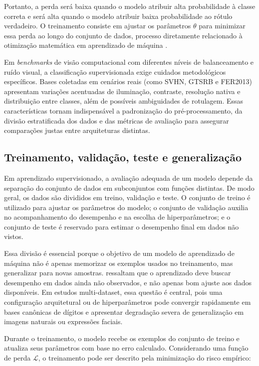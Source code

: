\documentclass[
    12pt,
    openright,
    oneside,
    a4paper,
    english,
    brazil
]{abntex2}
\begin{document}
Portanto, a perda será baixa quando o modelo atribuir alta probabilidade à classe correta e será alta quando o modelo atribuir baixa probabilidade ao rótulo verdadeiro. O treinamento consiste em ajustar os parâmetros \(\theta\) para minimizar essa perda ao longo do conjunto de dados, processo diretamente relacionado à otimização matemática em aprendizado de máquina \cite{deisenroth2020mathematics,goodfellow2016deep}.

Em \textit{benchmarks} de visão computacional com diferentes níveis de balanceamento e ruído visual, a classificação supervisionada exige cuidados metodológicos específicos. Bases coletadas em cenários reais (como SVHN, GTSRB e FER2013) apresentam variações acentuadas de iluminação, contraste, resolução nativa e distribuição entre classes, além de possíveis ambiguidades de rotulagem. Essas características tornam indispensável a padronização do pré-processamento, da divisão estratificada dos dados e das métricas de avaliação para assegurar comparações justas entre arquiteturas distintas.

\subsection{Treinamento, validação, teste e generalização}
\label{subsec:treinamento_validacao_teste_generalizacao}

Em aprendizado supervisionado, a avaliação adequada de um modelo depende da separação do conjunto de dados em subconjuntos com funções distintas. De modo geral, os dados são divididos em treino, validação e teste. O conjunto de treino é utilizado para ajustar os parâmetros do modelo; o conjunto de validação auxilia no acompanhamento do desempenho e na escolha de hiperparâmetros; e o conjunto de teste é reservado para estimar o desempenho final em dados não vistos.

Essa divisão é essencial porque o objetivo de um modelo de aprendizado de máquina não é apenas memorizar os exemplos usados no treinamento, mas generalizar para novas amostras.  ressaltam que o aprendizado deve buscar desempenho em dados ainda não observados, e não apenas bom ajuste aos dados disponíveis. Em estudos multi-dataset, essa questão é central, pois uma configuração arquitetural ou de hiperparâmetros pode convergir rapidamente em bases canônicas de dígitos e apresentar degradação severa de generalização em imagens naturais ou expressões faciais.

Durante o treinamento, o modelo recebe os exemplos do conjunto de treino e atualiza seus parâmetros com base no erro calculado. Considerando uma função de perda \(\mathcal{L}\), o treinamento pode ser descrito pela minimização do risco empírico:
\end{document}

